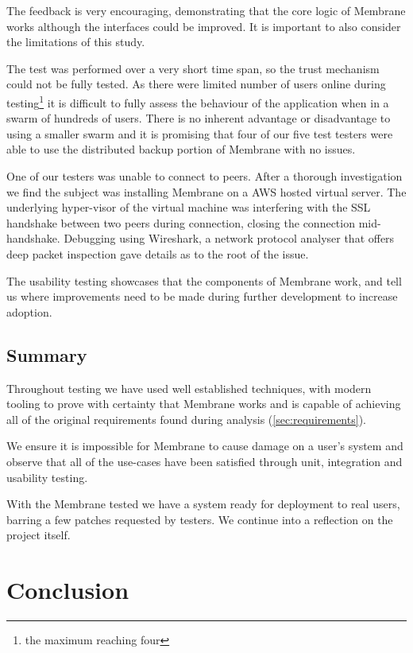 \documentclass[11pt, a4paper, twoside]{report}
\begin{document}
The feedback is very encouraging, demonstrating that the core logic of Membrane works although the interfaces could be improved. It is important to also consider the limitations of this study. 

The test was performed over a very short time span, so the trust mechanism could not be fully tested. As there were limited number of users online during testing\footnote{the maximum reaching four} it is difficult to fully assess the behaviour of the application when in a swarm of hundreds of users. There is no inherent advantage or disadvantage to using a smaller swarm and it is promising that four of our five test testers were able to use the distributed backup portion of Membrane with no issues.

One of our testers was unable to connect to peers. After a thorough investigation we find the subject was installing Membrane on a AWS hosted virtual server. The underlying hyper-visor of the virtual machine was interfering with the SSL handshake between two peers during connection, closing the connection mid-handshake. Debugging using Wireshark, a network protocol analyser that offers deep packet inspection gave details as to the root of the issue.

The usability testing showcases that the components of Membrane work, and tell us where improvements need to be made during further development to increase adoption.

\section{Summary}

Throughout testing we have used well established techniques, with modern tooling to prove with certainty that Membrane works and is capable of achieving all of the original requirements found during analysis (\ref{sec:requirements}).

We ensure it is impossible for Membrane to cause damage on a user's system and observe that all of the use-cases have been satisfied through unit, integration and usability testing.

With the Membrane tested we have a system ready for deployment to real users, barring a few patches requested by testers. We continue into a reflection on the project itself.

\chapter{Conclusion}
\end{document}
